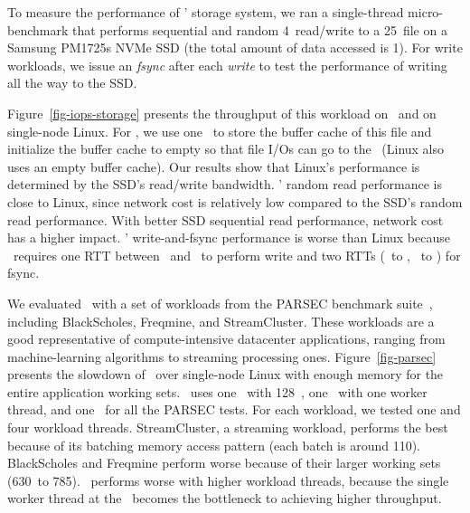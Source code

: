 To measure the performance of \lego' storage system, we ran a single-thread micro-benchmark 
that performs sequential and random 4\KB\ read/write to a 25\GB\ file on a Samsung PM1725s NVMe SSD (the total amount of data accessed is 1\GB).
For write workloads, we issue an {\em fsync} after each {\em write} to test the performance of writing all the way to the SSD.

Figure~\ref{fig-iops-storage} presents the throughput of this workload on \lego\ and on single-node Linux.
For \lego, we use one \mcomponent\ to store the buffer cache of this file and initialize the buffer cache to empty
so that file I/Os can go to the \scomponent\ (Linux also uses an empty buffer cache).
Our results show that Linux's performance is determined by the SSD's read/write bandwidth.
\lego' random read performance is close to Linux, since network cost is relatively low compared to the SSD's random read performance.
With better SSD sequential read performance, network cost has a higher impact.
\lego' write-and-fsync performance is worse than Linux because
\lego\ requires one RTT between \pcomponent\ and \mcomponent\ to perform write 
and two RTTs (\pcomponent\ to \mcomponent, \mcomponent\ to \scomponent) for fsync.


We evaluated \lego\ with a set of workloads from the PARSEC benchmark suite~\cite{PARSEC},
including BlackScholes, Freqmine, and StreamCluster.
These workloads are a good representative of compute-intensive datacenter applications, 
ranging from machine-learning algorithms to streaming processing ones.
Figure~\ref{fig-parsec} presents the slowdown of \lego\ 
over single-node Linux with enough memory for the entire application working sets.
\lego\ uses one \pcomponent\ with 128\MB\ \excache,
one \mcomponent\ with one worker thread, and one \scomponent\ for all the PARSEC tests.
For each workload, we tested one and four workload threads.
StreamCluster, a streaming workload, performs the best because of its 
batching memory access pattern (each batch is around 110\MB).
BlackScholes and Freqmine perform worse because of their larger working sets (630\MB\ to 785\MB).
\lego\ performs worse with higher workload threads, 
because the single worker thread at the \mcomponent\ becomes the bottleneck to achieving higher throughput.

